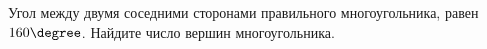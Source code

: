 \begin{ex}
	\begin{condition}
		Угол между двумя соседними сторонами правильного многоугольника, равен \( 160\degree \). Найдите число вершин многоугольника.
	\end{condition}
\end{ex}